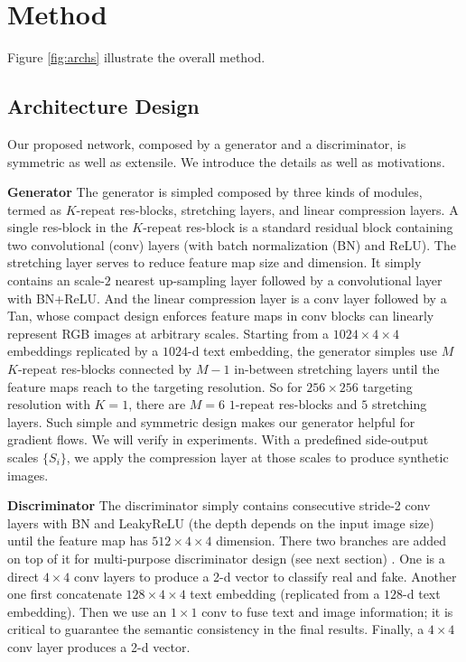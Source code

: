 \documentclass[10pt,twocolumn,letterpaper]{article}
\begin{document}
%
%
%
\begin{figure}[t]
	\centering
	\caption{} \label{fig:archs-compare}
\end{figure}

\section{Method}
Figure \ref{fig:archs} illustrate the overall method.

\subsection{Architecture Design}
Our proposed network, composed by a generator and a discriminator, is symmetric as well as extensile. We introduce the details as well as motivations.

\textbf{Generator} The generator is simpled composed by three kinds of modules, termed as $K$-repeat res-blocks, stretching layers, and linear compression layers.
A single res-block in the $K$-repeat res-block is a standard residual block  \cite{he2016identity} containing two convolutional (conv) layers (with batch normalization (BN) \cite{ioffe2015batch} and ReLU). The stretching layer serves to reduce feature map size and dimension. It simply contains an scale-$2$ nearest up-sampling layer followed by a convolutional layer with BN+ReLU. And the linear compression layer is a conv layer followed by a Tan, whose compact design enforces feature maps in conv blocks can linearly represent RGB images at arbitrary scales.
Starting from a $1024{\times}4{\times}4$ embeddings replicated by a $1024$-d text embedding, the generator simples use $M$ $K$-repeat res-blocks connected by $M{-}1$ in-between stretching layers until the feature maps reach to the targeting resolution. So for $256{\times}256$ targeting resolution with $K{=}1$, there are $M{=}6$ $1$-repeat res-blocks and $5$ stretching layers. Such simple and symmetric design makes our generator helpful for gradient flows. We will verify in experiments. 
With a predefined side-output scales $\{S_i\}$, we apply the compression layer at those scales to produce synthetic images.

\textbf{Discriminator} The discriminator simply contains consecutive stride-2 conv layers with BN and LeakyReLU \cite{} (the depth depends on the input image size) until the feature map has $512{\times}4{\times}4$ dimension. There two branches are added on top of it for multi-purpose discriminator design (see next section) . One is a direct $4{\times}4$ conv layers to produce a 2-d vector to classify real and fake. Another one first concatenate $128{\times}4{\times}4$ text embedding (replicated from a $128$-d text embedding). Then we use an $1{\times}1$ conv to fuse text and image information; it is critical to guarantee the semantic consistency in the final results. Finally, a $4{\times}4$ conv layer produces a 2-d vector.
\end{document}
